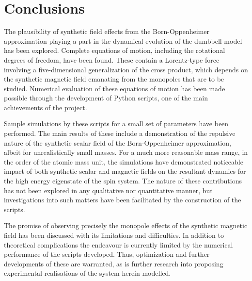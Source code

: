 \documentclass[main.tex]{subfiles}
\begin{document}
\section{Conclusions}
The plausibility of synthetic field effects from the Born-Oppenheimer approximation
playing a part in the dynamical evolution of the dumbbell model has been explored. Complete
equations of motion, including the rotational degrees of freedom, have been found. These
contain a Lorentz-type force involving a five-dimensional generalization of the cross
product, which depends on the synthetic magnetic field emanating from the monopoles that
are to be studied. Numerical evaluation of these equations of motion has been made
possible through the development of Python scripts, one of the main achievements of the
project.

Sample simulations by these scripts for a small set of parameters have been performed. The
main results of these include a demonstration of the repulsive nature of the synthetic
scalar field of the Born-Oppenheimer approximation, albeit for unrealistically small
masses. For a much more reasonable mass range, in the order of the atomic mass unit, the
simulations have demonstrated noticeable impact of both synthetic scalar and magnetic
fields on the resultant dynamics for the high energy eigenstate of the spin system. The nature of these contributions has not been explored
in any qualitative nor quantitative manner, but investigations into such matters have been facilitated by the construction of
the scripts.

The promise of observing precisely the monopole effects of the synthetic magnetic field
has been discussed with its limitations and difficulties. In addition to theoretical
complications the endeavour is currently limited by the numerical performance of the
scripts developed. Thus, optimization and further developments of these are warranted, as
is further research into proposing experimental realisations of the system herein modelled. 
\end{document}
